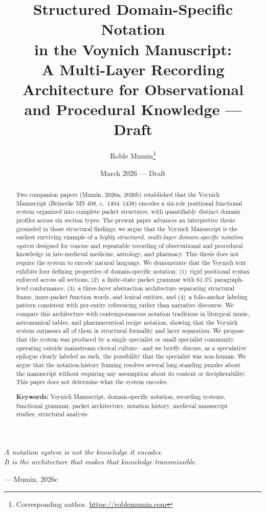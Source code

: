 \documentclass[11pt,a4paper,twocolumn]{article}
\title{\textbf{Structured Domain-Specific Notation\\in the Voynich Manuscript:}\\[4pt]
\large A Multi-Layer Recording Architecture for Observational\\
and Procedural Knowledge --- Draft \PaperVersion}
\author[1]{Roble Mumin\thanks{Corresponding author. \url{https://roblemumin.com}}}
\affil[1]{Independent AI Researcher and AI Consultant}
\date{March 2026 --- Draft \PaperVersion}
\begin{document}
\maketitle

\epigraph{\textit{A notation system is not the knowledge it encodes.\\
It is the architecture that makes that knowledge transmissible.}}{--- Mumin, 2026c}

\begin{abstract}
\noindent Two companion papers (Mumin, 2026a; 2026b) established that the Voynich Manuscript (Beinecke MS 408, c.\ 1404--1438) encodes a six-role positional functional system organized into complete packet structures, with quantifiably distinct domain profiles across six section types. The present paper advances an interpretive thesis grounded in those structural findings: we argue that the Voynich Manuscript is the earliest surviving example of a \textit{highly structured, multi-layer domain-specific notation system} designed for concise and repeatable recording of observational and procedural knowledge in late-medieval medicine, astrology, and pharmacy. This thesis does not require the system to encode natural language. We demonstrate that the Voynich text exhibits four defining properties of domain-specific notation: (1)~rigid positional syntax enforced across all sections, (2)~a finite-state packet grammar with 61.3\% paragraph-level conformance, (3)~a three-layer abstraction architecture separating structural frame, inner-packet function words, and lexical entities, and (4)~a folio-anchor labeling pattern consistent with per-entity referencing rather than narrative discourse. We compare this architecture with contemporaneous notation traditions in liturgical music, astronomical tables, and pharmaceutical recipe notation, showing that the Voynich system surpasses all of them in structural formality and layer separation. We propose that the system was produced by a single specialist or small specialist community operating outside mainstream clerical culture---and we briefly discuss, as a speculative epilogue clearly labeled as such, the possibility that the specialist was non-human. We argue that the notation-history framing resolves several long-standing puzzles about the manuscript without requiring any assumption about its content or decipherability. This paper does not determine what the system encodes.

\medskip
\noindent\textbf{Keywords:} Voynich Manuscript, domain-specific notation, recording systems, functional grammar, packet architecture, notation history, medieval manuscript studies, structural analysis
\end{abstract}
\end{document}
